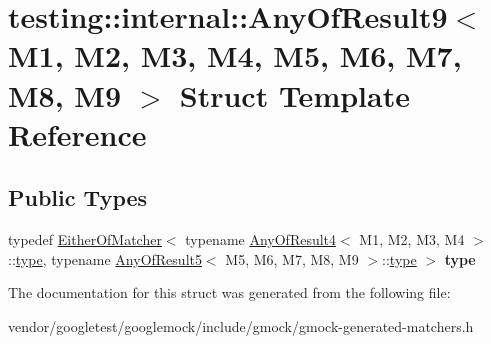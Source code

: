 \hypertarget{structtesting_1_1internal_1_1AnyOfResult9}{}\section{testing\+:\+:internal\+:\+:Any\+Of\+Result9$<$ M1, M2, M3, M4, M5, M6, M7, M8, M9 $>$ Struct Template Reference}
\label{structtesting_1_1internal_1_1AnyOfResult9}
\subsection*{Public Types}
\begin{DoxyCompactItemize}
\item 
typedef \hyperlink{classtesting_1_1internal_1_1EitherOfMatcher}{Either\+Of\+Matcher}$<$ typename \hyperlink{structtesting_1_1internal_1_1AnyOfResult4}{Any\+Of\+Result4}$<$ M1, M2, M3, M4 $>$\+::\hyperlink{classtesting_1_1internal_1_1EitherOfMatcher}{type}, typename \hyperlink{structtesting_1_1internal_1_1AnyOfResult5}{Any\+Of\+Result5}$<$ M5, M6, M7, M8, M9 $>$\+::\hyperlink{classtesting_1_1internal_1_1EitherOfMatcher}{type} $>$ {\bfseries type}\hypertarget{structtesting_1_1internal_1_1AnyOfResult9_a308935fb02c62f502044dcc7b0a2b464}{}\label{structtesting_1_1internal_1_1AnyOfResult9_a308935fb02c62f502044dcc7b0a2b464}

\end{DoxyCompactItemize}


The documentation for this struct was generated from the following file\+:\begin{DoxyCompactItemize}
\item 
vendor/googletest/googlemock/include/gmock/gmock-\/generated-\/matchers.\+h\end{DoxyCompactItemize}

